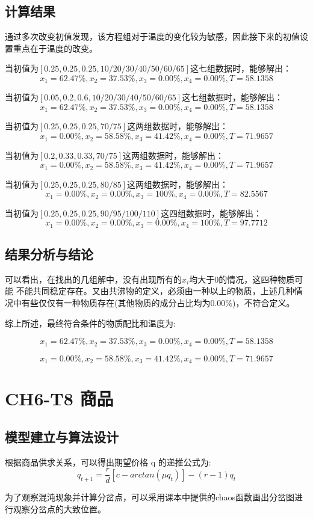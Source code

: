 \documentclass{article}
\begin{document}
\subsection{计算结果}
通过多次改变初值发现，该方程组对于温度的变化较为敏感，因此接下来的初值设置重点在于温度的改变。

当初值为$[0.25,0.25,0.25,10/20/30/40/50/60/65]$这七组数据时，能够解出：
$$x_1=62.47\%,x_2=37.53\%,x_3=0.00\%,x_4=0.00\%,T=58.1358$$

当初值为$[0.05,0.2,0.6,10/20/30/40/50/60/65]$这七组数据时，能够解出：
$$x_1=62.47\%,x_2=37.53\%,x_3=0.00\%,x_4=0.00\%,T=58.1358$$

当初值为$[0.25,0.25,0.25,70/75]$这两组数据时，能够解出：
$$x_1=0.00\%,x_2=58.58\%,x_3=41.42\%,x_4=0.00\%,T=71.9657$$

当初值为$[0.2,0.33,0.33,70/75]$这两组数据时，能够解出：
$$x_1=0.00\%,x_2=58.58\%,x_3=41.42\%,x_4=0.00\%,T=71.9657$$

当初值为$[0.25,0.25,0.25,80/85]$这两组数据时，能够解出：
$$x_1=0.00\%,x_2=0.00\%,x_3=100\%,x_4=0.00\%,T=82.5567$$

当初值为$[0.25,0.25,0.25,90/95/100/110]$这四组数据时，能够解出：
$$x_1=0.00\%,x_2=0.00\%,x_3=0.00\%,x_4=100\%,T=97.7712$$

\subsection{结果分析与结论}

可以看出，在找出的几组解中，没有出现所有的$x_i$均大于0的情况，这四种物质可能 不能共同稳定存在。又由共沸物的定义，必须由一种以上的物质，上述几种情况中有些仅仅有一种物质存在(其他物质的成分占比均为0.00\%)，不符合定义。

综上所述，最终符合条件的物质配比和温度为:

$$x_1=62.47\%,x_2=37.53\%,x_3=0.00\%,x_4=0.00\%,T=58.1358$$

$$x_1=0.00\%,x_2=58.58\%,x_3=41.42\%,x_4=0.00\%,T=71.9657$$

\section{CH6-T8 商品}
\subsection{模型建立与算法设计}
根据商品供求关系，可以得出期望价格 q 的递推公式为:
$$q_{t+1} = \frac{r}{d}[c-arctan(\mu q_t)]-(r-1)q_t$$

为了观察混沌现象并计算分岔点，可以采用课本中提供的chaos函数画出分岔图进行观察分岔点的大致位置。
\end{document}
